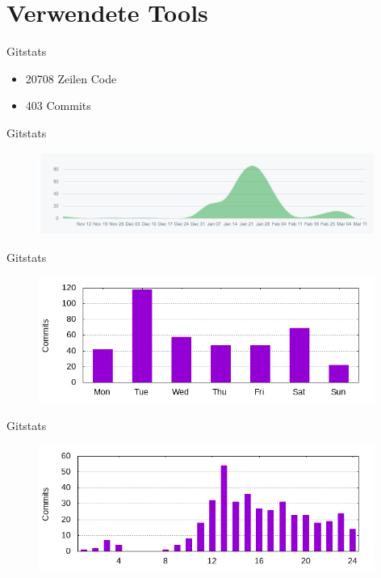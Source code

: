 \documentclass[11pt, usepdftitle=false,...]{beamer}
\begin{document}
	\frame{\sectionpage}
	
	
	\section{Verwendete Tools}
	\frame{\sectionpage}
	
	\begin{frame}{Gitstats}
	    \begin{itemize}
	        \item 20708 Zeilen Code
	        \item 403 Commits
	    \end{itemize}
	\end{frame}
	
	\begin{frame}{Gitstats}
	    \begin{figure}[ht] 
					\centering
					\includegraphics[width=11cm]{images/PSE_Commits.PNG}
				\end{figure}
	\end{frame}
	
	\begin{frame}{Gitstats}
	    \begin{figure}[ht] 
					\centering
					\includegraphics[width=11cm]{images/day_of_week.png}
				\end{figure}
	\end{frame}
	
	\begin{frame}{Gitstats}
	    \begin{figure}[ht] 
					\centering
					\includegraphics[width=11cm]{images/hour_of_day.png}
				\end{figure}
	\end{frame}
	
\end{document}

